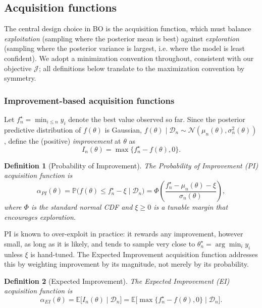 \documentclass{article}
\newtheorem{defn}{Definition}
\begin{document}
	\subsection{Acquisition functions}
	
	The central design choice in BO is the acquisition function, which must balance \textit{exploitation} (sampling where the posterior mean is best) against \textit{exploration} (sampling where the posterior variance is largest, i.e. where the model is least confident). We adopt a minimization convention throughout, consistent with our objective $\mathcal{J}$; all definitions below translate to the maximization convention by symmetry.
	
	\subsubsection{Improvement-based acquisition functions}
	
	Let $f^\star_n = \min_{i \le n} y_i$ denote the best value observed so far. Since the posterior predictive distribution of $f(\theta)$ is Gaussian, $f(\theta) \mid \mathcal{D}_n \sim \mathcal{N}(\mu_n(\theta), \sigma_n^2(\theta))$, define the (positive) \textit{improvement} at $\theta$ as
	\begin{equation}
		I_n(\theta) = \max\{f^\star_n - f(\theta), 0\}.
	\end{equation}
	
	\begin{defn}[Probability of Improvement]
		The \textit{Probability of Improvement} (PI) acquisition function is
		\begin{equation}
			\alpha_{PI}(\theta) = \mathbb{P}\big(f(\theta) \le f^\star_n - \xi \mid \mathcal{D}_n\big) = \Phi\!\left( \frac{f^\star_n - \mu_n(\theta) - \xi}{\sigma_n(\theta)} \right),
		\end{equation}
		where $\Phi$ is the standard normal CDF and $\xi \ge 0$ is a tunable margin that encourages exploration.
	\end{defn}
	
	PI is known to over-exploit in practice: it rewards any improvement, however small, as long as it is likely, and tends to sample very close to $\theta^\star_n = \arg\min_i y_i$ unless $\xi$ is hand-tuned. The Expected Improvement acquisition function addresses this by weighting improvement by its magnitude, not merely by its probability.
	
	\begin{defn}[Expected Improvement]
		The \textit{Expected Improvement} (EI) acquisition function is
		\begin{equation}
			\alpha_{EI}(\theta) = \mathbb{E}\big[I_n(\theta) \mid \mathcal{D}_n\big] = \mathbb{E}\big[\max\{f^\star_n - f(\theta), 0\} \mid \mathcal{D}_n \big].
		\end{equation}
	\end{defn}
	
\end{document}
